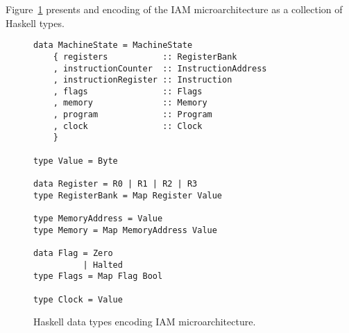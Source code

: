 

Figure~\ref{fig:IAMtypes} presents and encoding of the IAM microarchitecture
as a collection of Haskell types.

\begin{figure}[t]
\caption{Haskell data types encoding IAM microarchitecture.\label{fig:IAMtypes}}
\begin{verbatim}
data MachineState = MachineState
    { registers           :: RegisterBank
    , instructionCounter  :: InstructionAddress
    , instructionRegister :: Instruction
    , flags               :: Flags
    , memory              :: Memory
    , program             :: Program
    , clock               :: Clock
    }

type Value = Byte

data Register = R0 | R1 | R2 | R3
type RegisterBank = Map Register Value

type MemoryAddress = Value
type Memory = Map MemoryAddress Value

data Flag = Zero
          | Halted
type Flags = Map Flag Bool

type Clock = Value
\end{verbatim}
\end{figure}
